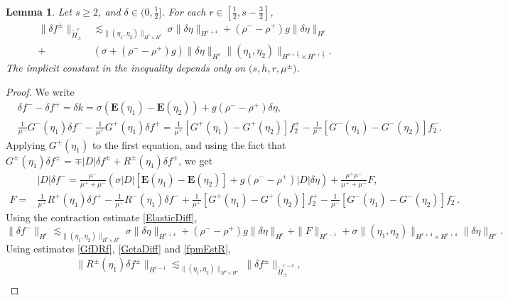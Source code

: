 \documentclass[12pt]{amsart}
\newtheorem{lemma}[theorem]{Lemma}
\theoremstyle{definition}
\numberwithin{equation}{section}
\newcommand{\f}{\frac}
\begin{document}
\begin{lemma}
Let $s\geq 2$, and $\delta \in (0, \f12]$.
For each $r\in [\f12, s-\f32]$,
\begin{equation} \label{DeltaFpmEst}
\begin{aligned}
 \|\delta f^\pm \|_{\tilde{H}^r_\pm} &\lesssim_{\|(\eta_1, \eta_2)\|_{H^s\times H^s}} \sigma \|\delta \eta \|_{H^{r+4}}+ (\rho^- -\rho^+)g \|\delta \eta\|_{H^r}\\
 +& (\sigma+(\rho^--\rho^+)g)\| \delta \eta\|_{H^s}\|(\eta_1, \eta_2)\|_{H^{s+\f52}\times H^{s+\f52}}.
\end{aligned}    
\end{equation}
The implicit constant in the inequality depends only on $\big(s,h, r,\mu^\pm\big)$.
\end{lemma}

\begin{proof}
We write
\begin{align*}
&\delta f^- - \delta f^+ = \delta k = \sigma (\mathbf{E}(\eta_1)-\mathbf{E}(\eta_2)) + g(\rho^- - \rho^+)\delta \eta, \\
&\f{1}{\mu^-}G^-(\eta_1)\delta f^- - \f{1}{\mu^+}G^+(\eta_1)\delta f^+ = \f{1}{\mu^+}[G^+(\eta_1)-G^+(\eta_2)]f_2^+ - \f{1}{\mu^-}[G^-(\eta_1)-G^-(\eta_2)]f_2^-.
\end{align*}
Applying $G^+(\eta_1)$ to the first equation, and using the fact that $G^\pm(\eta_1)\delta f^\pm = \mp |D|\delta f^\pm + R^\pm(\eta_1)\delta f^\pm$, we get
\begin{align*}
&|D|\delta f^- = \f{\mu^-}{\mu^+ + \mu^-}(\sigma|D|[\mathbf{E}(\eta_1)-\mathbf{E}(\eta_2)] + g(\rho^- - \rho^+)|D|\delta \eta) + \f{\mu^+ \mu^-}{\mu^++\mu^-}F, \\
F =& \f{1}{\mu^+}R^+(\eta_1)\delta f^+ -  \f{1}{\mu^-}R^-(\eta_1)\delta f^- + \f{1}{\mu^+}[G^+(\eta_1)-G^+(\eta_2)]f^+_2  - \f{1}{\mu^-}[G^-(\eta_1)-G^-(\eta_2)]f_2^-.
\end{align*}
Using the contraction estimate \eqref{ElasticDiff}, 
\begin{equation*}
 \|\delta f^-\|_{H^r}  \lesssim_{\|(\eta_1, \eta_2)\|_{H^{s}\times H^{s}}} \sigma \|\delta \eta \|_{H^{r+4}}+ (\rho^- -\rho^+)g \|\delta \eta\|_{H^r} + \|F \|_{H^{r-1}} + \sigma \| (\eta_1,\eta_2) \|_{H^{r+4}\times H^{r+4}}\| \delta \eta\|_{H^{s}} .
\end{equation*}
Using estimates \eqref{GfDRf}, \eqref{GetaDiff} and \eqref{fpmEstR},
\begin{align*} 
&\| R^\pm(\eta_1)\delta f^\pm\|_{H^{r-1}} \lesssim_{\|(\eta_1,\eta_2)\|_{H^s\times H^s}}\|\delta f^{\pm}\|_{\tilde{H}^{r-\delta}_{\pm}}, \\

\end{align*}
\end{proof}
\end{document}

